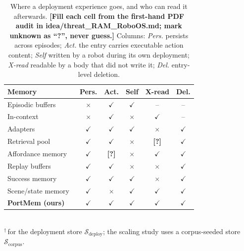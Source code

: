 \documentclass[letterpaper, 10 pt, conference]{ieeeconf}
\newcommand{\sysname}{PortMem}
\newcommand{\todo}[1]{\textbf{[#1]}}
\begin{document}
\begin{table}[t]
\caption{Where a deployment experience goes, and who can read it afterwards.
\todo{Fill each cell from the first-hand PDF audit in idea/threat\_RAM\_RoboOS.md;
mark unknown as ``?'', never guess.}
Columns: \emph{Pers.} persists across episodes; \emph{Act.} the entry carries
executable action content; \emph{Self} written by a robot during its own
deployment; \emph{X-read} readable by a body that did not write it;
\emph{Del.} entry-level deletion.}
\label{tab:landscape}
\centering
\begin{tabular}{@{}lccccc@{}}
\toprule
Memory & Pers. & Act. & Self & X-read & Del. \\
\midrule
Episodic buffers~\cite{memoryvla,mem}      & $\times$    & $\checkmark$ & $\checkmark$ & --           & --           \\
In-context~\cite{robottt,mimicdroid}       & $\times$    & $\checkmark$ & $\times$     & $\checkmark$ & --           \\
Adapters~\cite{clare,vlapro}               & $\checkmark$& $\checkmark$ & $\checkmark$ & $\times$     & $\checkmark$ \\
Retrieval pool~\cite{recap}                & $\checkmark$& $\checkmark$ & $\times$     & \todo{?}     & $\checkmark$ \\
Affordance memory~\cite{ram,roboabc}       & $\checkmark$& \todo{?}     & $\times$     & $\checkmark$ & $\checkmark$ \\
Replay buffers~\cite{dipalo2023,dinobot,vinn} & $\checkmark$& $\checkmark$ & $\times$  & $\times$     & $\checkmark$ \\
Success memory~\cite{rts,dejavu,roboharness} & $\checkmark$& $\checkmark$ & $\checkmark$ & $\times$   & $\checkmark$ \\
Scene/state memory~\cite{roboos}           & $\checkmark$& $\times$     & $\checkmark$ & $\checkmark$ & $\checkmark$ \\
\midrule
\textbf{\sysname{} (ours)}                 & $\checkmark$& $\checkmark$ & $\checkmark$\rlap{$^{\dagger}$} & $\checkmark$ & $\checkmark$ \\
\bottomrule
\end{tabular}
\\[2pt]
\footnotesize $^{\dagger}$\,for the deployment store $\mathcal{S}_\mathrm{deploy}$;
the scaling study uses a corpus-seeded store $\mathcal{S}_\mathrm{corpus}$.
\end{table}
\end{document}

